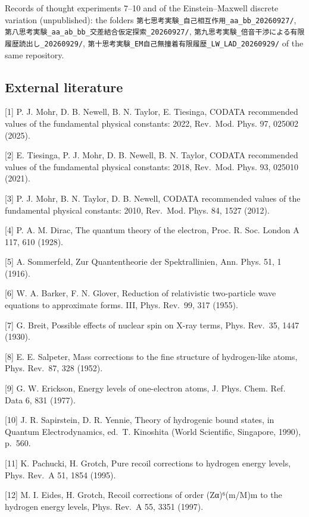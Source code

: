 \documentclass[
  a4paper,
]{article}
\begin{document}
Records of thought experiments 7--10 and of the Einstein--Maxwell
discrete variation (unpublished): the folders
\texttt{第七思考実験\_自己相互作用\_aa\_bb\_20260927/},
\texttt{第八思考実験\_aa\_ab\_bb\_交差結合仮定探索\_20260927/},
\texttt{第九思考実験\_倍音干渉による有限履歴読出し\_20260929/},
\texttt{第十思考実験\_EM自己無撞着有限履歴\_LW\_LAD\_20260929/} of the
same repository.

\subsection{External literature}\label{external-literature}

{[}1{]} P. J. Mohr, D. B. Newell, B. N. Taylor, E. Tiesinga, CODATA
recommended values of the fundamental physical constants: 2022,
Rev.~Mod. Phys. 97, 025002 (2025).

{[}2{]} E. Tiesinga, P. J. Mohr, D. B. Newell, B. N. Taylor, CODATA
recommended values of the fundamental physical constants: 2018,
Rev.~Mod. Phys. 93, 025010 (2021).

{[}3{]} P. J. Mohr, B. N. Taylor, D. B. Newell, CODATA recommended
values of the fundamental physical constants: 2010, Rev.~Mod. Phys. 84,
1527 (2012).

{[}4{]} P. A. M. Dirac, The quantum theory of the electron, Proc. R.
Soc. London A 117, 610 (1928).

{[}5{]} A. Sommerfeld, Zur Quantentheorie der Spektrallinien, Ann. Phys.
51, 1 (1916).

{[}6{]} W. A. Barker, F. N. Glover, Reduction of relativistic
two-particle wave equations to approximate forms. III, Phys. Rev.~99,
317 (1955).

{[}7{]} G. Breit, Possible effects of nuclear spin on X-ray terms, Phys.
Rev.~35, 1447 (1930).

{[}8{]} E. E. Salpeter, Mass corrections to the fine structure of
hydrogen-like atoms, Phys. Rev.~87, 328 (1952).

{[}9{]} G. W. Erickson, Energy levels of one-electron atoms, J. Phys.
Chem. Ref. Data 6, 831 (1977).

{[}10{]} J. R. Sapirstein, D. R. Yennie, Theory of hydrogenic bound
states, in Quantum Electrodynamics, ed.~T. Kinoshita (World Scientific,
Singapore, 1990), p.~560.

{[}11{]} K. Pachucki, H. Grotch, Pure recoil corrections to hydrogen
energy levels, Phys. Rev.~A 51, 1854 (1995).

{[}12{]} M. I. Eides, H. Grotch, Recoil corrections of order (Zα)⁶(m/M)m
to the hydrogen energy levels, Phys. Rev.~A 55, 3351 (1997).
\end{document}
